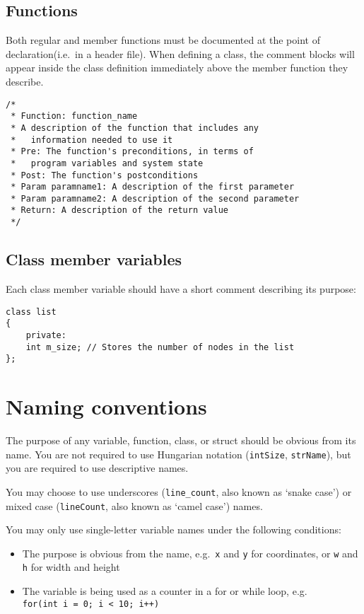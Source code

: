 \documentclass{article}
\newcommand{\code}[1]{\texttt{\colorbox{gray!30}{#1}}}
\begin{document}
\subsection{Functions}
Both regular and member functions must be documented at the point of declaration(i.e.\ in a header file).
When defining a class, the comment blocks will appear inside the class definition immediately above the member function they describe.

\begin{lstlisting}
/*
 * Function: function_name
 * A description of the function that includes any
 *   information needed to use it
 * Pre: The function's preconditions, in terms of
 *   program variables and system state
 * Post: The function's postconditions
 * Param paramname1: A description of the first parameter
 * Param paramname2: A description of the second parameter
 * Return: A description of the return value
 */
\end{lstlisting}

\subsection{Class member variables}
Each class member variable should have a short comment describing its purpose:
\begin{lstlisting}
class list
{
	private:
	int m_size; // Stores the number of nodes in the list
};
\end{lstlisting}

\section{Naming conventions}
The purpose of any variable, function, class, or struct should be obvious from its name.
You are not required to use Hungarian notation (\code{intSize}, \code{strName}), but you are required to use descriptive names.

You may choose to use underscores (\code{line\_count}, also known as `snake case') or mixed case (\code{lineCount}, also known as `camel case') names.

You may only use single-letter variable names under the following conditions:
\begin{itemize}
	\item The purpose is obvious from the name, e.g.\ \code{x} and \code{y} for coordinates, or \code{w} and \code{h} for width and height
	\item The variable is being used as a counter in a for or while loop, e.g.\\ \code{for(int i = 0; i < 10; i++)}
\end{itemize}
\end{document}
